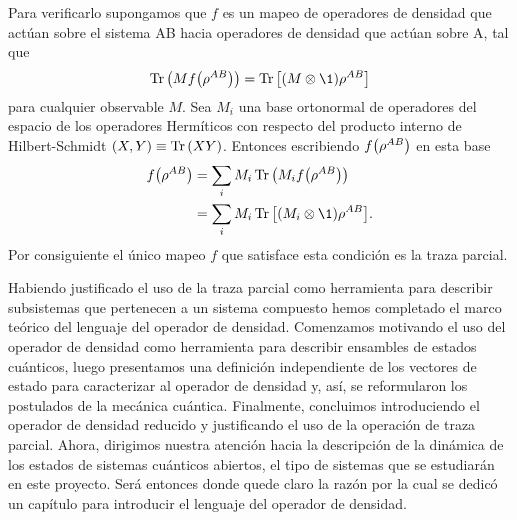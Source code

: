 Para verificarlo supongamos que $f$ es un mapeo de operadores de 
densidad que actúan sobre el sistema AB hacia operadores de densidad 
que actúan sobre A, tal que 
\begin{align}
	\Tr \qty(Mf\qty(\rho^{AB})) = \Tr \qty[\qty(M\tensor \1)\rho^{AB}]
\end{align}
para cualquier observable $M$. Sea $M_i$ una base ortonormal de operadores
del espacio de los operadores Hermíticos con respecto del producto interno
de Hilbert-Schmidt $\qty(X,Y)\equiv \Tr\qty(XY)$. Entonces escribiendo
$f\qty(\rho ^{AB})$ en esta base
\begin{align}
	f\qty(\rho^{AB}) 
	&= \sum_i M_i\Tr\qty(M_if\qty(\rho^{AB})) \\
	&= \sum_i M_i\Tr\qty[\qty(M_i\tensor \1)\rho^{AB}].
\end{align}
Por consiguiente el único mapeo $f$ que satisface esta condición
es la traza parcial. 

Habiendo justificado el uso de la traza parcial como herramienta para 
describir subsistemas que pertenecen a un sistema compuesto hemos completado
el marco teórico del lenguaje del operador de densidad. Comenzamos
motivando el uso del operador de densidad como herramienta 
para describir ensambles de
estados cuánticos, luego presentamos una definición independiente
de los vectores de estado para caracterizar al operador de densidad y, así,
se reformularon los postulados de la mecánica cuántica.
Finalmente, concluimos introduciendo el operador de densidad reducido y
justificando el uso de la operación de traza parcial. Ahora, dirigimos
nuestra atención hacia la descripción de la dinámica de los estados
de sistemas cuánticos abiertos, el tipo de sistemas que se estudiarán
en este proyecto. Será entonces donde quede claro
la razón por la cual se dedicó un capítulo para introducir 
el lenguaje del operador de densidad.


